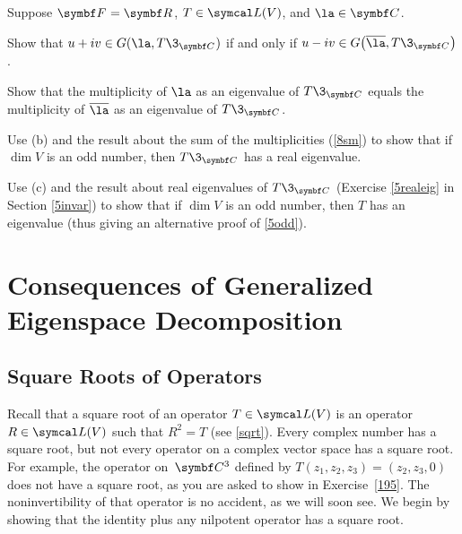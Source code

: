 \begin{exercises}
\exercise
Suppose $\F{} = \R{}$, $T \in \L(V)$, and $\la \in \C{}$.\label{8compmult}
\begin{subtheorem}
\item
Show that $u + iv \in G\paren{ \la, T\3_{\C{}} }$ if and only if $u - iv \in G\paren[\big]{ \overline{\la}, T\3_{\C{}}}$.
\item
Show that the multiplicity of $\la$ as an eigenvalue of $T\3_{\C{}}$ equals the \mbox{multiplicity} of $\bar{\la}$ as an eigenvalue of $T\3_{\C{}}$.
\item
Use (b) and the result about the sum of the multiplicities (\ref{8sm}) to show that if $\dim V$ is an odd number, then $T\3_{\C{}}$ has a real eigenvalue.
\item
Use (c) and the result about real eigenvalues of $T\3_{\C{}}$ (Exercise \ref{5realeig} in Section \ref{5invar}) to show that if $\dim V$ is an odd number, then $T$ has an eigenvalue (thus giving an alternative proof of \ref{5odd}).
\end{subtheorem}


\end{exercises}

\CrCom

\section[Consequences of Generalized Eigenspace Decomposition]{Consequences of Generalized Eigenspace Decomposition} \label{8geneigde}

\subsection{Square Roots of Operators}

Recall that a square root of an operator $T \in \L(V)$ is an operator $R \in \L(V)$
such that $R^2 = T$ (see \ref{sqrt}). Every complex number has a square root, but not every operator on
a complex vector space has a square root.
For example, the operator on~$\C{3}$ defined by $T(z_1, z_2, z_3) = (z_2, z_3, 0)$ does not have a square root, as you are asked to show in Exercise~\ref{195}.  The noninvertibility of that operator is no accident, as we will soon see.  We begin by showing that the identity plus any nilpotent operator has a square root.

